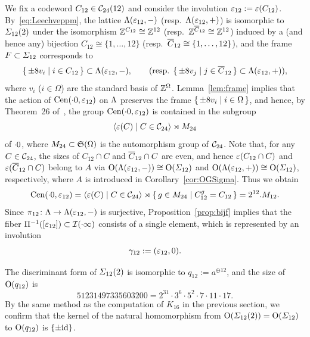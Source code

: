 \documentclass{amsart} %
\begin{document}
%
We fix a codeword $C_{12}\in \mathord{\mathcal{C}}_{24}(12)$ and 
consider the involution 
$\varepsilon_{12}:=\varepsilon(C_{12})$.
%
By~\eqref{eq:Leechveppm}, 
the  lattice $\Lambda (\varepsilon_{12}, -)$ (resp.~$\Lambda (\varepsilon_{12}, +)$)
is isomorphic 
 to $\varSigma_{12} (2)$ under 
the isomorphism $\mathord{\mathbb{Z}}^{C_{12}}\cong \mathord{\mathbb{Z}}^{12}$  (resp.~$\mathord{\mathbb{Z}}^{\overline{C}_{12}}\cong \mathord{\mathbb{Z}}^{12}$)
induced by a (and hence any) bijection 
$C_{12}\cong \{1, \dots, 12\}$ (resp.~$\overline{C}_{12}\cong \{1, \dots, 12\}$),
and the frame $F\subset \varSigma_{12}$ corresponds to
\[
\{\,{\pm 8 v_i}\mid {i\in C_{12}} \,\}\subset \Lambda(\varepsilon_{12}, -),
\qquad 
(\textrm{resp. }
\{\,{\pm 8 v_j}\mid {j\in \overline{C}_{12}} \,\}\subset \Lambda(\varepsilon_{12}, +)),
\]
where $v_i$ ($i\in \Omega$) are the standard basis of $\mathord{\mathbb{Z}}^{\Omega}$.
Lemma~\ref{lem:frame}
implies that the action of $\mathrm{Cen}(\cdot 0, \varepsilon_{12})$ 
on $\Lambda$ preserves the frame $\{\,{\pm 8 v_i}\mid {i\in \Omega} \,\}$,
and hence, by Theorem~26 of~\cite[Chapter~10, Section~3.3]{theCSbook},  
the group $\mathrm{Cen}(\cdot 0, \varepsilon_{12}) $ is contained 
in the subgroup
\[
\langle {\varepsilon(C) \mid C \in \mathord{\mathcal{C}}_{24}} \rangle\rtimes M_{24} 
\]
of $\cdot 0$,
where $M_{24}\subset  \mathord{\mathfrak{S}}(\Omega)$ is the automorphism group of $ \mathord{\mathcal{C}}_{24}$.
Note that, for any $C\in \mathord{\mathcal{C}}_{24}$,
the sizes of $C_{12}\cap C$  and  $\overline{C}_{12}\cap C$
are even, and hence 
$\varepsilon(C_{12}\cap C)$ and $\varepsilon( \overline{C}_{12}\cap C)$ belong to $ A$ via 
$ \mathord{\mathrm{O}}(\Lambda(\varepsilon_{12}, -))\cong \mathord{\mathrm{O}}(\varSigma_{12})$ and $ \mathord{\mathrm{O}}(\Lambda(\varepsilon_{12}, +))\cong \mathord{\mathrm{O}}(\varSigma_{12})$,
respectively,
where $A$ is introduced in Corollary~\ref{cor:OGSigma}.
Thus  we obtain 
%
\begin{equation}\label{eq:M12}
\mathrm{Cen}(\cdot 0, \varepsilon_{12})=\langle {\varepsilon(C) \mid C \in \mathord{\mathcal{C}}_{24}} \rangle\rtimes \{\,{g\in M_{24}}\mid {C_{12}^g=C_{12}} \,\}=2^{12}. M_{12}.
\end{equation}
%
Since $\pi_{12}\colon \Lambda\to \Lambda(\varepsilon_{12}, -)$ is surjective,
Proposition~\ref{prop:bijf} implies that the fiber $\Pi^{-1} ([\varepsilon_{12}])\subset \mathord{\mathcal{I}}(\cdot \infty)$  consists of a single element,
 which is 
 represented  by an involution 
 \[
 \gamma_{12}:=(\varepsilon_{12}, 0).
 \]
 \begin{remark}\label{rem:q12}
 The discriminant form of $\varSigma_{12}(2)$  is isomorphic to
 $q_{12}:=a^{\oplus 12}$, 
and the  size of $\mathord{\mathrm{O}}(q_{12})$ is 
\[
51231497335603200={2}^{31} \cdot {3}^{6} \cdot {5}^{2} \cdot {7} \cdot {11} \cdot {17}.
\]
 By the same method as the computation of $K_{16}$ in the previous section,
 we confirm that the kernel of the natural homomorphism from 
 $\mathord{\mathrm{O}}(\varSigma_{12}(2))=\mathord{\mathrm{O}}(\varSigma_{12})$ to $\mathord{\mathrm{O}}(q_{12})$ 
 is $\{\pm \mathord{\mathrm{id}}\}$.
 \end{remark}
\end{document}
